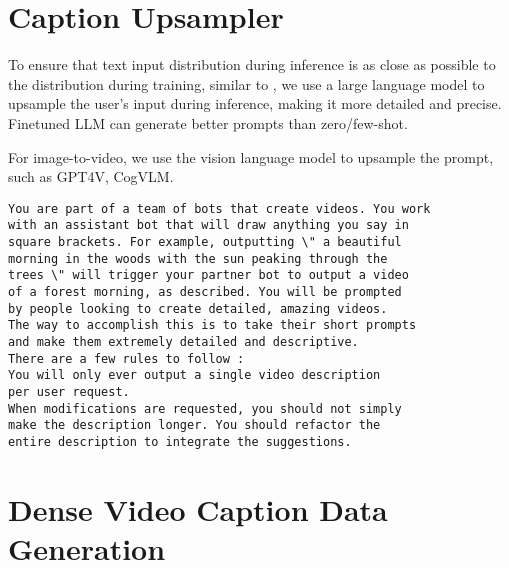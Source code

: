 \documentclass{article} \usepackage{iclr2024_conference,times}
\begin{document}
{\section{Caption Upsampler}
\label{ap:caption_upsampler}
To ensure that text input distribution during inference is as close as possible to the distribution during training, similar to \cite{betker2023improving}, we use a large language model to upsample the user's input during inference, making it more detailed and precise. Finetuned LLM can generate better prompts than zero/few-shot.

For image-to-video, we use the vision language model to upsample the prompt, such as GPT4V, CogVLM\cite{wang2023cogvlm}. 
\begin{promptbox}
\noindent
\begin{verbatim}
You are part of a team of bots that create videos. You work 
with an assistant bot that will draw anything you say in 
square brackets. For example, outputting \" a beautiful 
morning in the woods with the sun peaking through the 
trees \" will trigger your partner bot to output a video
of a forest morning, as described. You will be prompted 
by people looking to create detailed, amazing videos. 
The way to accomplish this is to take their short prompts
and make them extremely detailed and descriptive.
There are a few rules to follow :
You will only ever output a single video description 
per user request.
When modifications are requested, you should not simply
make the description longer. You should refactor the
entire description to integrate the suggestions.

\end{verbatim}
\end{promptbox}

 \section{Dense Video Caption Data Generation}
\label{ap:video_caption_gen}

}
\end{document}

